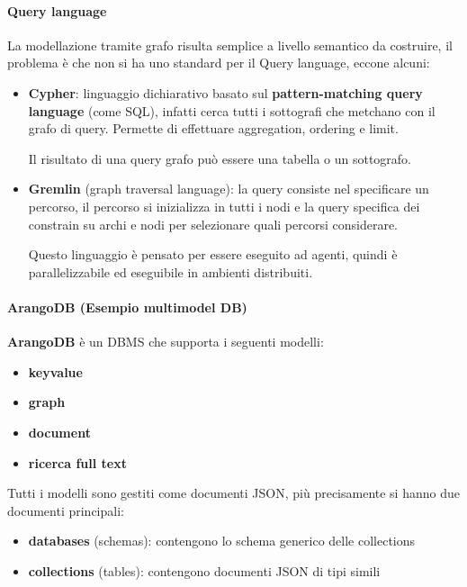 \paragraph{Query language}
La modellazione tramite grafo risulta semplice a livello semantico da costruire,
il problema è che non si ha uno standard per il Query language, eccone alcuni:
\begin{itemize}
      \item \textbf{Cypher}: linguaggio dichiarativo basato sul \textbf{pattern-matching 
      query language} (come SQL), infatti cerca tutti i sottografi che metchano 
      con il grafo di query. Permette di effettuare aggregation, ordering
      e limit.

      Il risultato di una query grafo può essere una tabella o un sottografo.
      \item \textbf{Gremlin} (graph traversal language): la query consiste nel specificare 
      un percorso, il percorso si inizializza in tutti i nodi e la query specifica
      dei constrain su archi e nodi per selezionare quali percorsi considerare. 

      Questo linguaggio è pensato per essere eseguito ad agenti, quindi è parallelizzabile
      ed eseguibile in ambienti distribuiti.
\end{itemize}

\paragraph{ArangoDB (Esempio multimodel DB)}

\textbf{ArangoDB} è un DBMS che supporta i seguenti modelli:
\begin{itemize}
      \item \textbf{keyvalue}
      \item \textbf{graph}
      \item \textbf{document}
      \item \textbf{ricerca full text}
\end{itemize}

Tutti i modelli sono gestiti come documenti JSON, più precisamente si hanno due 
documenti principali:
\begin{itemize}
      \item \textbf{databases} (schemas): contengono lo schema generico delle collections 
      \item \textbf{collections} (tables): contengono documenti JSON di tipi simili
\end{itemize} 

